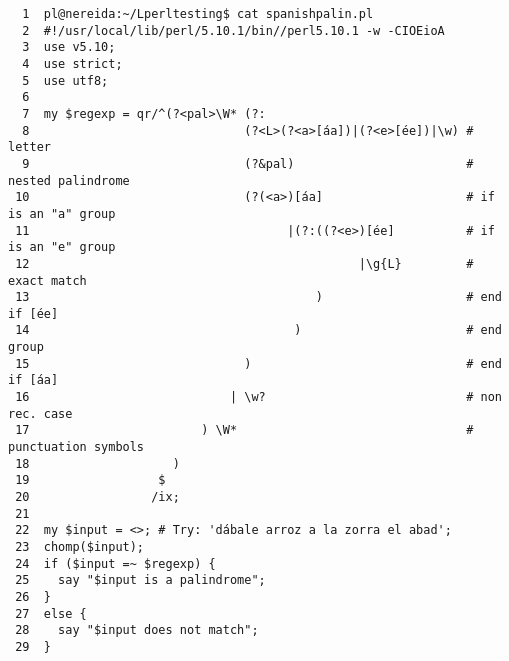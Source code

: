 \begin{latexonly}
\begin{verbatim}
  1  pl@nereida:~/Lperltesting$ cat spanishpalin.pl
  2  #!/usr/local/lib/perl/5.10.1/bin//perl5.10.1 -w -CIOEioA
  3  use v5.10;
  4  use strict;
  5  use utf8;
  6  
  7  my $regexp = qr/^(?<pal>\W* (?: 
  8                              (?<L>(?<a>[áa])|(?<e>[ée])|\w) # letter
  9                              (?&pal)                        # nested palindrome
 10                              (?(<a>)[áa]                    # if is an "a" group
 11                                    |(?:((?<e>)[ée]          # if is an "e" group
 12                                              |\g{L}         # exact match
 13                                        )                    # end if [ée]
 14                                     )                       # end group
 15                              )                              # end if [áa]
 16                            | \w?                            # non rec. case
 17                        ) \W*                                # punctuation symbols
 18                    )
 19                  $
 20                 /ix;
 21  
 22  my $input = <>; # Try: 'dábale arroz a la zorra el abad';
 23  chomp($input);
 24  if ($input =~ $regexp) {
 25    say "$input is a palindrome";
 26  }
 27  else {
 28    say "$input does not match";
 29  }
\end{verbatim}
\end{latexonly}
